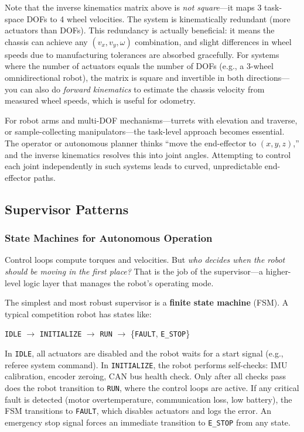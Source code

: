 Note that the inverse kinematics matrix above is \textit{not square}---it maps 3 task-space DOFs to 4 wheel velocities. The system is kinematically redundant (more actuators than DOFs). This redundancy is actually beneficial: it means the chassis can achieve any $(v_x, v_y, \omega)$ combination, and slight differences in wheel speeds due to manufacturing tolerances are absorbed gracefully. For systems where the number of actuators equals the number of DOFs (e.g., a 3-wheel omnidirectional robot), the matrix is square and invertible in both directions---you can also do \textit{forward kinematics} to estimate the chassis velocity from measured wheel speeds, which is useful for odometry.

For robot arms and multi-DOF mechanisms---turrets with elevation and traverse, or sample-collecting manipulators---the task-level approach becomes essential. The operator or autonomous planner thinks ``move the end-effector to $(x, y, z)$,'' and the inverse kinematics resolves this into joint angles. Attempting to control each joint independently in such systems leads to curved, unpredictable end-effector paths.

\subsection{Supervisor Patterns}

\subsubsection{State Machines for Autonomous Operation}

Control loops compute torques and velocities. But \textit{who decides when the robot should be moving in the first place?} That is the job of the supervisor---a higher-level logic layer that manages the robot's operating mode.

The simplest and most robust supervisor is a \textbf{finite state machine} (FSM). A typical competition robot has states like:

\begin{center}
\texttt{IDLE} $\to$ \texttt{INITIALIZE} $\to$ \texttt{RUN} $\to$ \{\texttt{FAULT}, \texttt{E\_STOP}\}
\end{center}

In \texttt{IDLE}, all actuators are disabled and the robot waits for a start signal (e.g., referee system command). In \texttt{INITIALIZE}, the robot performs self-checks: IMU calibration, encoder zeroing, CAN bus health check. Only after all checks pass does the robot transition to \texttt{RUN}, where the control loops are active. If any critical fault is detected (motor overtemperature, communication loss, low battery), the FSM transitions to \texttt{FAULT}, which disables actuators and logs the error. An emergency stop signal forces an immediate transition to \texttt{E\_STOP} from any state.


